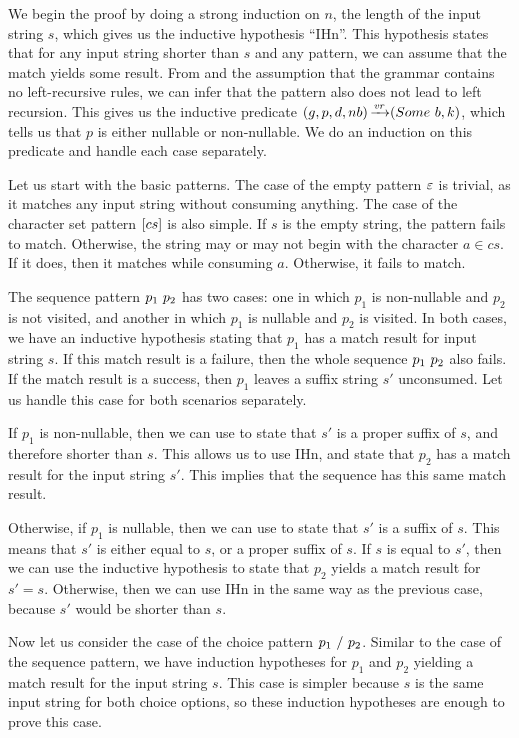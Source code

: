 We begin the proof by doing a strong induction on $n$,
the length of the input string $s$,
which gives us the inductive hypothesis ``IHn''.
This hypothesis states that for any input string shorter than $s$
and any pattern, we can assume that the match yields some result.
From 
and the assumption that the grammar contains no left-recursive rules,
we can infer that the pattern also does not lead to left recursion.
This gives us the inductive predicate
$(g,p,d,nb) \operatorname{\xrightarrow{\mathit{vr}}} (Some\ b,k)$,
which tells us that $p$ is either nullable or non-nullable.
We do an induction on this predicate
and handle each case separately.

Let us start with the basic patterns.
The case of the empty pattern $\varepsilon{}$ is trivial,
as it matches any input string without consuming anything.
The case of the character set pattern $[cs]$ is also simple.
If $s$ is the empty string, the pattern fails to match.
Otherwise, the string may or may not begin with the character $a \in cs$.
If it does, then it matches while consuming $a$.
Otherwise, it fails to match.

The sequence pattern $p_1\ p_2$ has two cases:
one in which $p_1$ is non-nullable and $p_2$ is not visited,
and another in which $p_1$ is nullable and $p_2$ is visited.
In both cases, we have an inductive hypothesis stating that
$p_1$ has a match result for input string $s$.
If this match result is a failure,
then the whole sequence $p_1\ p_2$ also fails.
If the match result is a success,
then $p_1$ leaves a suffix string $s'$ unconsumed.
Let us handle this case for both scenarios separately.

If $p_1$ is non-nullable,
then we can use 
to state that $s'$ is a proper suffix of $s$,
and therefore shorter than $s$.
This allows us to use IHn,
and state that $p_2$ has a match result for the input string $s'$.
This implies that the sequence has this same match result.

Otherwise, if $p_1$ is nullable, then we can use
 to state that
$s'$ is a suffix of $s$.
This means that $s'$ is either equal to $s$, or a proper suffix of $s$.
If $s$ is equal to $s'$,
then we can use the inductive hypothesis
to state that $p_2$ yields a match result for $s'=s$.
Otherwise, then we can use IHn in the same way as the previous case,
because $s'$ would be shorter than $s$.

Now let us consider the case of the choice pattern $p_1\ /\ p_2$.
Similar to the case of the sequence pattern,
we have induction hypotheses for $p_1$ and $p_2$
yielding a match result for the input string $s$.
This case is simpler because $s$ is the same input string for both choice options,
so these induction hypotheses are enough to prove this case.

